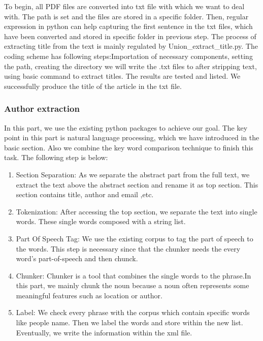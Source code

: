To begin, all PDF files are converted into txt file with which we want to deal with. 
The path is set and the files are stored in a specific folder. 
Then, regular expression in python can help capturing the first sentence in the txt files, which have been converted and stored in specific folder in previous step. 
The process of extracting title from the text is mainly regulated by Union\_extract\_title.py. 
The coding scheme has following steps:Importation of necessary components, setting the path, creating the directory we will write the .txt files to after stripping text, using basic command to extract titles. The results are tested and listed. 
We successfully produce the title of the article in the txt file. 

\subsubsection{Author extraction}

In this part, we use the existing python packages to achieve our goal.
The key point in this part is natural language processing,  which we have introduced in the basic section. Also we combine the key word comparison technique to finish this task. The following step is below:

\begin{enumerate}
	
	\item Section Separation: As we separate the abstract part from the full text, we extract the text above the 
	abstract section and rename it as top section. 
	This section contains title, author and email ,etc.
	\item Tokenization: After accessing the top section, we separate the text into single words. 
	These single words composed with a string list. 
	\item Part Of Speech Tag: We use the existing corpus to tag the part of speech to the words. 
	This step is necessary since that the chunker needs the every word's part-of-speech and then chunck.
	\item Chunker: Chunker is a tool that combines the single words to the phrase.In this part, we mainly chunk the noun because a noun often represents some meaningful features 
	such as location or author.
	\item Label: We check every phrase with the corpus which contain specific words like people name. 
	Then we label the words and store within the new list. 
	Eventually, we write the information within the xml file. 
	
\end{enumerate}

